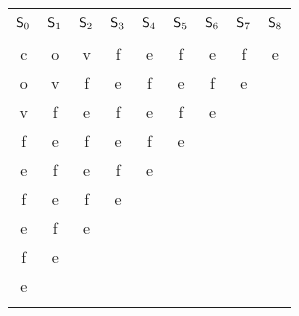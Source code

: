 \begin{tabular}{!{\color{white}\vrule} c !{\color{white}\vrule} c !{\color{white}\vrule} c !{\color{white}\vrule} c !{\color{white}\vrule} c !{\color{white}\vrule} c !{\color{white}\vrule} c !{\color{white}\vrule} c !{\color{white}\vrule} c !{\color{white}\vrule}}
	 &  &  &  &  &  \\
	\hline
	\(\mathsf{S}_{0}\)&\(\mathsf{S}_{1}\)&\(\mathsf{S}_{2}\)&\(\mathsf{S}_{3}\)&\(\mathsf{S}_{4}\)&\(\mathsf{S}_{5}\)&\(\mathsf{S}_{6}\)&\(\mathsf{S}_{7}\)&\(\mathsf{S}_{8}\)\\
	 &  &  &  &  &  &  &  &  \\
	\hline
	c&o&v&f&e&f&e&f&e\\
	o&v&f&e&f&e&f&e& \\
	v&f&e&f&e&f&e& & \\
	f&e&f&e&f&e& & & \\
	e&f&e&f&e& & & & \\
	f&e&f&e& & & & & \\
	e&f&e& & & & & & \\
	f&e& & & & & & & \\
	e& & & & & & & & \\
	\hline
\end{tabular}
